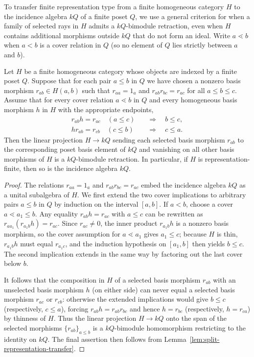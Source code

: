 To transfer finite representation type from a finite homogeneous category $H$ to the incidence algebra $kQ$ of a finite poset $Q$, we use a general criterion for when a family of selected rays in $H$ admits a $kQ$-bimodule retraction, even when $H$ contains additional morphisms outside $kQ$ that do not form an ideal. Write $a\lessdot b$ when $a<b$ is a cover relation in $Q$ (so no element of $Q$ lies strictly between $a$ and $b$).

\begin{lemma}
\label{lem:configuration-retraction}
Let $H$ be a finite homogeneous category whose objects are indexed by a finite poset $Q$. Suppose that for each pair $a\leq b$ in $Q$ we have chosen a nonzero basis morphism $r_{ab}\in H(a,b)$ such that $r_{aa}=1_a$ and $r_{ab}r_{bc}=r_{ac}$ for all $a\leq b\leq c$. Assume that for every cover relation $a\lessdot b$ in $Q$ and every homogeneous basis morphism $h$ in $H$ with the appropriate endpoints,
\[
  \begin{split}
  r_{ab}h=r_{ac}\quad(a\leq c)&\quad\Longrightarrow\quad b\leq c,\\
  hr_{ab}=r_{cb}\quad(c\leq b)&\quad\Longrightarrow\quad c\leq a.
  \end{split}
\]
Then the linear projection $H\to kQ$ sending each selected basis morphism $r_{ab}$ to the corresponding poset basis element of $kQ$ and vanishing on all other basis morphisms of $H$ is a $kQ$-bimodule retraction. In particular, if $H$ is representation-finite, then so is the incidence algebra $kQ$.
\end{lemma}
\begin{proof}
The relations $r_{aa}=1_a$ and $r_{ab}r_{bc}=r_{ac}$ embed the incidence algebra $kQ$ as a unital subalgebra of $H$. We first extend the two cover implications to arbitrary pairs $a\leq b$ in $Q$ by induction on the interval $[a,b]$. If $a<b$, choose a cover $a\lessdot a_1\leq b$. Any equality $r_{ab}h=r_{ac}$ with $a\leq c$ can be rewritten as $r_{aa_1}(r_{a_1b}h)=r_{ac}$. Since $r_{ac}\ne0$, the inner product $r_{a_1b}h$ is a nonzero basis morphism, so the cover assumption for $a\lessdot a_1$ gives $a_1\leq c$; because $H$ is thin, $r_{a_1b}h$ must equal $r_{a_1c}$, and the induction hypothesis on $[a_1,b]$ then yields $b\leq c$. The second implication extends in the same way by factoring out the last cover below $b$.

It follows that the composition in $H$ of a selected basis morphism $r_{ab}$ with an unselected basis morphism $h$ (on either side) can never equal a selected basis morphism $r_{ac}$ or $r_{cb}$: otherwise the extended implications would give $b\leq c$ (respectively, $c\leq a$), forcing $r_{ab}h=r_{ab}r_{bc}$ and hence $h=r_{bc}$ (respectively, $h=r_{ca}$) by thinness of $H$. Thus the linear projection $H\to kQ$ onto the span of the selected morphisms $\{r_{ab}\}_{a\leq b}$ is a $kQ$-bimodule homomorphism restricting to the identity on $kQ$. The final assertion then follows from Lemma~\ref{lem:split-representation-transfer}.
\end{proof}

